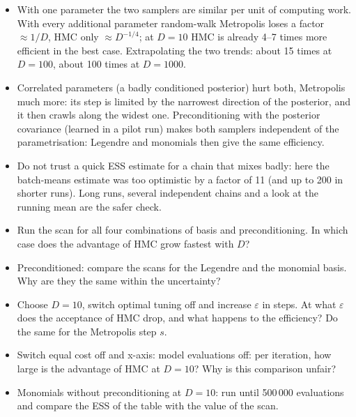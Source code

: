 \documentclass[11pt,a4paper]{article}
\newcommand{\ctl}[1]{\textsf{#1}}                              %
\begin{document}
\begin{keypoint}
\begin{itemize}[leftmargin=*]
\item With one parameter the two samplers are similar per unit of computing work. With every additional
  parameter random-walk Metropolis loses a factor $\approx1/D$, HMC only $\approx D^{-1/4}$; at $D=10$ HMC is
  already 4--7 times more efficient in the best case. Extrapolating the two trends: about 15 times at $D=100$,
  about 100 times at $D=1000$.
\item Correlated parameters (a badly conditioned posterior) hurt both, Metropolis much more: its step is limited
  by the narrowest direction of the posterior, and it then crawls along the widest one. Preconditioning with the
  posterior covariance (learned in a pilot run) makes both samplers independent of the parametrisation:
  Legendre and monomials then give the same efficiency.
\item Do not trust a quick ESS estimate for a chain that mixes badly: here the batch-means estimate was too
  optimistic by a factor of 11 (and up to 200 in shorter runs). Long runs, several independent chains and a look at
  the running mean are the safer check.
\end{itemize}
\end{keypoint}

\begin{tryit}
\begin{itemize}
\item Run the scan for all four combinations of basis and preconditioning. In which case does the advantage of
  HMC grow fastest with $D$?
\item Preconditioned: compare the scans for the Legendre and the monomial basis. Why are they the same within the
  uncertainty?
\item Choose $D=10$, switch \ctl{optimal tuning} off and increase $\varepsilon$ in steps. At what $\varepsilon$
  does the acceptance of HMC drop, and what happens to the efficiency? Do the same for the Metropolis step $s$.
\item Switch \ctl{equal cost} off and \ctl{x-axis: model evaluations} off: per iteration, how large is the
  advantage of HMC at $D=10$? Why is this comparison unfair?
\item Monomials without preconditioning at $D=10$: run until 500\,000 evaluations and compare the ESS of the
  table with the value of the scan.
\end{itemize}
\end{tryit}
\end{document}
